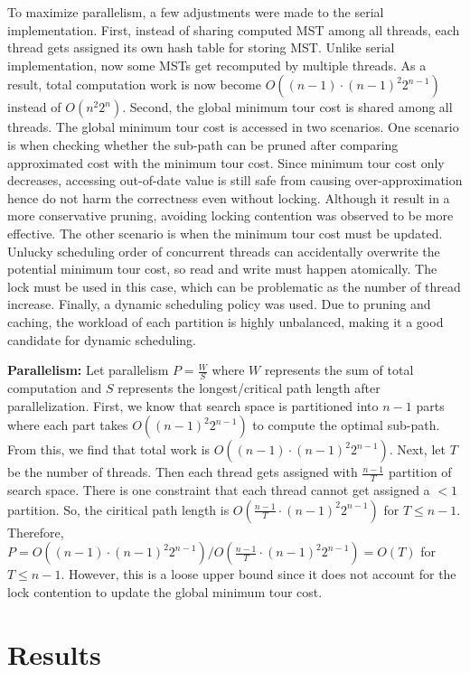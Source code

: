 \documentclass[conference]{IEEEtran}
\begin{document}
To maximize parallelism, a few adjustments were made to the serial implementation. First, instead of sharing computed MST among all threads, each thread gets assigned its own hash table for storing MST. Unlike serial implementation, now some MSTs get recomputed by multiple threads. As a result, total computation work is now become $O((n-1) \cdot (n-1)^2 2^{n-1})$ instead of $O(n^2 2^n)$. Second, the global minimum tour cost is shared among all threads. The global minimum tour cost is accessed in two scenarios. One scenario is when checking whether the sub-path can be pruned after comparing approximated cost with the minimum tour cost. Since minimum tour cost only decreases, accessing out-of-date value is still safe from causing over-approximation hence do not harm the correctness even without locking. Although it result in a more conservative pruning, avoiding locking contention was observed to be more effective. The other scenario is when the minimum tour cost must be updated. Unlucky scheduling order of concurrent threads can accidentally overwrite the potential minimum tour cost, so read and write must happen atomically. The lock must be used in this case, which can be problematic as the number of thread increase. Finally, a dynamic scheduling policy was used. Due to pruning and caching, the workload of each partition is highly unbalanced, making it a good candidate for dynamic scheduling.


\textbf{Parallelism:} 
Let parallelism $P = \frac{W}{S}$ where $W$ represents the sum of total computation and $S$ represents the longest/critical path length after parallelization. First, we know that search space is partitioned into $n-1$ parts where each part takes $O((n-1)^2 2^{n-1})$ to compute the optimal sub-path. From this, we find that total work is $O((n-1) \cdot (n-1)^2 2^{n-1})$. Next, let $T$ be the number of threads. Then each thread gets assigned with $\frac{n-1}{T}$ partition of search space. There is one constraint that each thread cannot get assigned a $< 1$ partition. So, the ciritical path length is $O(\frac{n-1}{T} \cdot (n-1)^2 2^{n-1})$ for $T \leq n-1$. Therefore, $P = O((n-1) \cdot (n-1)^2 2^{n-1}) / O(\frac{n-1}{T} \cdot (n-1)^2 2^{n-1}) = O(T)$ for $T \leq n-1$. However, this is a loose upper bound since it does not account for the lock contention to update the global minimum tour cost.


\section{Results}
\end{document}
